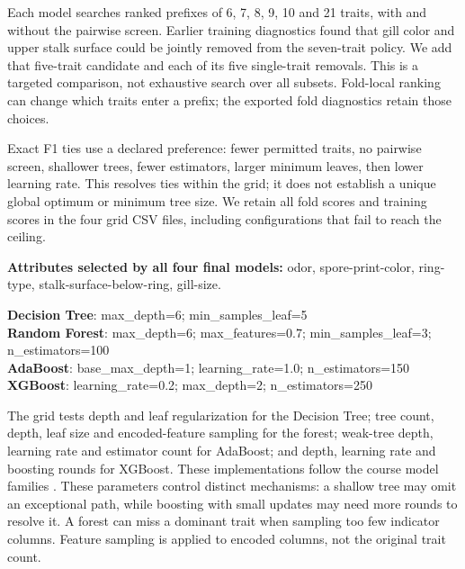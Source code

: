 \documentclass[11pt]{article}
\begin{document}
Each model searches ranked prefixes of 6, 7, 8, 9, 10 and 21 traits, with and without the pairwise screen. Earlier training diagnostics found that gill color and upper stalk surface could be jointly removed from the seven-trait policy. We add that five-trait candidate and each of its five single-trait removals. This is a targeted comparison, not exhaustive search over all subsets. Fold-local ranking can change which traits enter a prefix; the exported fold diagnostics retain those choices.

Exact F1 ties use a declared preference: fewer permitted traits, no pairwise screen, shallower trees, fewer estimators, larger minimum leaves, then lower learning rate. This resolves ties within the grid; it does not establish a unique global optimum or minimum tree size. We retain all fold scores and training scores in the four grid CSV files, including configurations that fail to reach the ceiling.

\textbf{Attributes selected by all four final models:} odor, spore-print-color, ring-type, stalk-surface-below-ring, gill-size.

\textbf{Decision Tree}: max\_depth=6; min\_samples\_leaf=5\\
\textbf{Random Forest}: max\_depth=6; max\_features=0.7; min\_samples\_leaf=3; n\_estimators=100\\
\textbf{AdaBoost}: base\_max\_depth=1; learning\_rate=1.0; n\_estimators=150\\
\textbf{XGBoost}: learning\_rate=0.2; max\_depth=2; n\_estimators=250

The grid tests depth and leaf regularization for the Decision Tree; tree count, depth, leaf size and encoded-feature sampling for the forest; weak-tree depth, learning rate and estimator count for AdaBoost; and depth, learning rate and boosting rounds for XGBoost. These implementations follow the course model families \cite{nagarnotebooks,sklearnensembles,xgbintro}. These parameters control distinct mechanisms: a shallow tree may omit an exceptional path, while boosting with small updates may need more rounds to resolve it. A forest can miss a dominant trait when sampling too few indicator columns. Feature sampling is applied to encoded columns, not the original trait count.
\end{document}
